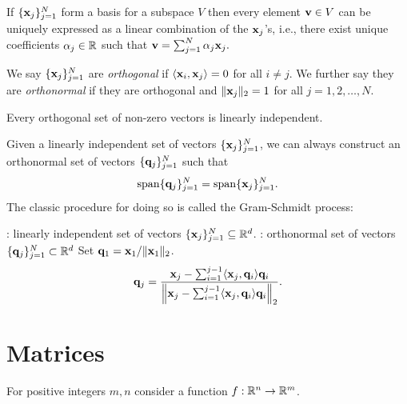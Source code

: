\begin{lemma}
If $\{ \mathbf{x}_j\}_{j=1}^N$ form a basis for a subspace $V$ then every element 
$\mathbf{v} \in V$ can be uniquely expressed as a linear combination of 
the $\mathbf{x}_j$'s, i.e., there exist unique coefficients $\alpha_j \in \mathbb{R}$ such that
$\mathbf{v} = \sum_{j=1}^N \alpha_j \mathbf{x}_j.$    
\end{lemma}




We say  $\{\mathbf{x}_j\}_{j=1}^N$ 
are {\it orthogonal} if $\langle \mathbf{x}_i, \mathbf{x}_j \rangle = 0$ for all $i \neq j$.
We further say they are {\it orthonormal} if they are orthogonal and $\|\mathbf{x}_j\|_2 = 1$ for all $j=1,2,\ldots,N$. 

\begin{lemma}
    Every orthogonal set of non-zero vectors is linearly independent.
\end{lemma}

Given a linearly independent set of vectors $\{ \mathbf{x}_j \}_{j=1}^N$, 
we can always construct an orthonormal set of vectors $\{\mathbf{q}_j\}_{j=1}^N$
such that 
\begin{equation*}
    \mathrm{span}\{\mathbf{q}_j\}_{j=1}^N = \mathrm{span}\{\mathbf{x}_j\}_{j=1}^N.
\end{equation*}
The classic procedure for doing so is called the Gram-Schmidt process: 
\begin{algorithm}
\caption{Gram-Schmidt Process}
\begin{algorithmic}
    : linearly independent set of vectors 
    $\{\mathbf{x}_j\}_{j=1}^N \subseteq \mathbb{R}^d$.
    : orthonormal set of vectors $\{\mathbf{q}_j\}_{j=1}^N \subset \mathbb{R}^d$
    \vspace{2ex}
    \State Set $\mathbf{q}_1 = \mathbf{x}_1 / \|\mathbf{x}_1\|_2$.
        \State 
        \begin{equation*}
            \mathbf{q}_j = \frac{\mathbf{x}_j - \sum_{i=1}^{j-1} \langle \mathbf{x}_j, \mathbf{q}_i \rangle \mathbf{q}_i}{\left\| \mathbf{x}_j - \sum_{i=1}^{j-1} \langle \mathbf{x}_j, \mathbf{q}_i \rangle \mathbf{q}_i \right\|_2}.
        \end{equation*}
    \EndFor
\end{algorithmic}
\end{algorithm}


\section{Matrices}

For positive integers $m, n$ consider a function $f: \mathbb{R}^n \to \mathbb{R}^m$. 

